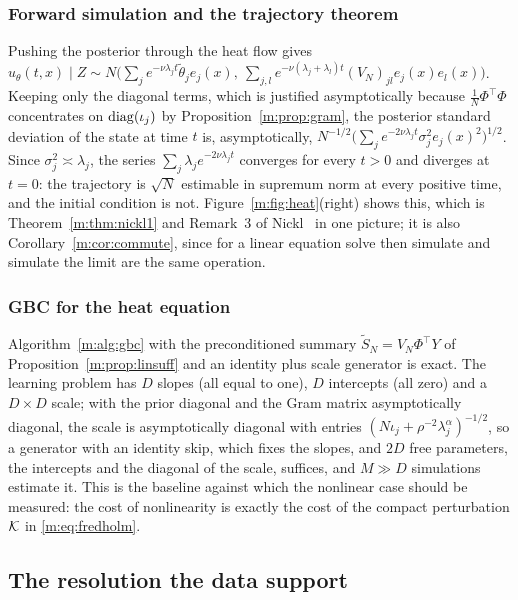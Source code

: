 \subsubsection{Forward simulation and the trajectory theorem} Pushing the posterior through the heat flow gives $u_\theta(t,x)\mid Z\sim N\big(\sum_je^{-\nu\lambda_jt}\tilde\theta_je_j(x),\ \sum_{j,l}e^{-\nu(\lambda_j+\lambda_l)t}(V_N)_{jl}e_j(x)e_l(x)\big)$. Keeping only the diagonal terms, which is justified asymptotically because $\frac1N\Phi^\top\Phi$ concentrates on $\operatorname{diag}(\iota_j)$ by Proposition~\ref{m:prop:gram}, the posterior standard deviation of the state at time $t$ is, asymptotically, $N^{-1/2}\big(\sum_je^{-2\nu\lambda_jt}\sigma_j^2e_j(x)^2\big)^{1/2}$. Since $\sigma_j^2\asymp\lambda_j$, the series $\sum_j\lambda_je^{-2\nu\lambda_jt}$ converges for every $t>0$ and diverges at $t=0$: the trajectory is $\sqrt N$ estimable in supremum norm at every positive time, and the initial condition is not. Figure~\ref{m:fig:heat}(right) shows this, which is Theorem~\ref{m:thm:nickl1} and Remark~3 of Nickl~\cite{nicklbvm2024} in one picture; it is also Corollary~\ref{m:cor:commute}, since for a linear equation solve then simulate and simulate the limit are the same operation.

\subsubsection{GBC for the heat equation} Algorithm~\ref{m:alg:gbc} with the preconditioned summary $\tilde S_N=V_N\Phi^\top Y$ of Proposition~\ref{m:prop:linsuff} and an identity plus scale generator is exact. The learning problem has $D$ slopes (all equal to one), $D$ intercepts (all zero) and a $D\times D$ scale; with the prior diagonal and the Gram matrix asymptotically diagonal, the scale is asymptotically diagonal with entries $(N\iota_j+\rho^{-2}\lambda_j^\alpha)^{-1/2}$, so a generator with an identity skip, which fixes the slopes, and $2D$ free parameters, the intercepts and the diagonal of the scale, suffices, and $M\gg D$ simulations estimate it. This is the baseline against which the nonlinear case should be measured: the cost of nonlinearity is exactly the cost of the compact perturbation $\mathcal{K}$ in \eqref{m:eq:fredholm}.

\subsection{The resolution the data support}\label{m:sec:resolution}

